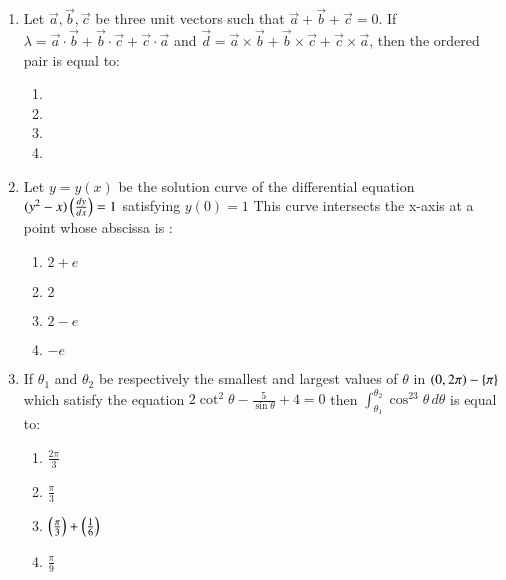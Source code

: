 \documentclass[journal,12pt,twocolumn]{IEEEtran}
\theoremstyle{remark}
\begin{document}
\begin{enumerate}
    \item Let $\vec{a},\vec{b},\vec{c}$ be three unit vectors such that $\vec{a}+\vec{b}+\vec{c}=0$. If $\lambda=\vec{a}\cdot\vec{b}+\vec{b}\cdot\vec{c}+\vec{c}\cdot\vec{a}$ and $\vec{d}=\vec{a}\times\vec{b}+\vec{b}\times\vec{c}+\vec{c}\times\vec{a}$, then the ordered pair  is equal to: 
        \begin{enumerate}
            \item {}
            \item {}
            \item {}
            \item {}
        \end{enumerate}

    \item Let $y=y(x)$ be the solution curve of the differential equation $(y^2-x)\left(\frac{dy}{dx}\right)=1$ satisfying $y(0)=1$ This curve intersects the x-axis at a point whose abscissa is :
        \begin{enumerate}
            \item $2+e$
            \item $2$
            \item $2-e$
            \item $-e$
        \end{enumerate}

    \item If $\theta_1$ and $\theta_2$ be respectively the smallest and largest values of $\theta$ in $\left(0,2\pi\right)-\left\{\pi\right\}$ which satisfy the equation $2\cot^2\theta-\frac{5}{\sin\theta}+4=0$ then $\int_{\theta_1}^{\theta_2}\cos^23\theta\,d\theta$ is equal to:
        \begin{enumerate}
            \item $\frac{2\pi}{3}$
            \item $\frac{\pi}{3}$
            \item $\left(\frac{\pi}{3}\right)+\left(\frac{1}{6}\right)$
            \item $\frac{\pi}{9}$
        \end{enumerate}

\end{enumerate}
\end{document}
